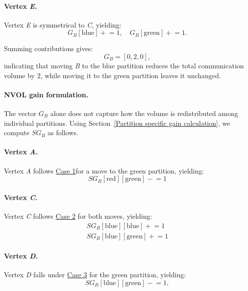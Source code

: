 \paragraph{Vertex \textit{E}.} Vertex \textit{E} is symmetrical to \textit{C}, yielding:
\[
G_B[\text{blue}] \mathrel{+}= 1, \quad
G_B[\text{green}] \mathrel{+}= 1.
\]

Summing contributions gives:
\[
G_B = [0, 2, 0],
\]
indicating that moving \textit{B} to the blue partition reduces the total communication volume by $2$, while moving it to the green partition leaves it unchanged. 

\paragraph{NVOL gain formulation.}
The vector $G_B$ alone does not capture how the volume is redistributed among individual partitions. Using Section~\ref{Partition specific gain calculation}, we compute $SG_B$ as follows.

\paragraph{Vertex \textit{A}.} Vertex \textit{A} follows \hyperlink{NVOL_case_1}{Case 1}for a move to the green partition, yielding:
\[
SG_B[\text{red}][\text{green}] \mathrel{-}= 1
\]

\paragraph{Vertex \textit{C}.} Vertex \textit{C} follows \hyperlink{NVOL_case_2}{Case 2} for both moves, yielding:
\begin{align*}
	SG_B[\text{blue}][\text{blue}] \mathrel{+}= 1 \\
	SG_B[\text{blue}][\text{green}] \mathrel{+}= 1
\end{align*}

\paragraph{Vertex \textit{D}.} Vertex \textit{D} falls under \hyperlink{NVOL_case_3}{Case 3} for the green partition, yielding: 
\[
SG_B[\text{blue}][\text{green}] \mathrel{-}= 1,
\]

